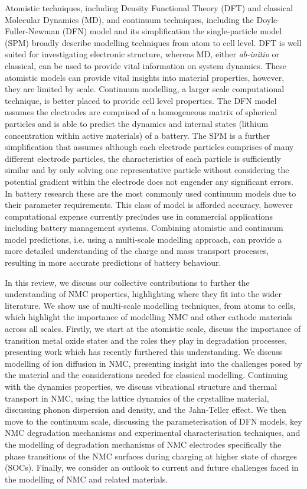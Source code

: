 \documentclass[journal=jacsat,manuscript=article]{achemso}
\begin{document}
Atomistic techniques, including Density Functional Theory (DFT) and classical Molecular Dynamics (MD), and continuum techniques, including the Doyle-Fuller-Newman (DFN) model and its simplification the single-particle model (SPM) \cite{Newman1975porous, Doyle1993DFN} broadly describe modelling techniques from atom to cell level. \cite{Howey_2020} DFT is well suited for investigating electronic structure, whereas MD, either \textit{ab-initio} or classical, can be used to provide vital information on system dynamics. These atomistic models can provide vital insights into material properties, however, they are limited by scale. Continuum modelling, a larger scale computational technique, is better placed to provide cell level properties. The DFN model assumes the electrodes are comprised of a homogeneous matrix of spherical particles and is able to predict the dynamics and internal states (lithium concentration within active materials) of a battery. The SPM is a further simplification that assumes although each electrode particles comprises of many different electrode particles, the characteristics of each particle is sufficiently similar and by only solving one representative particle without considering the potential gradient within the electrode does not engender any significant errors. In battery research these are the most commonly used continuum models due to their parameter requirements. This class of model is afforded accuracy, however computational expense currently precludes use in commercial applications including battery management systems. Combining atomistic and continuum model predictions, i.e. using a multi-scale modelling approach, can provide a more detailed understanding of the charge and mass transport processes, resulting in more accurate predictions of battery behaviour.

In this review, we discuss our collective contributions to further the understanding of NMC properties, highlighting where they fit into the wider literature. We show use of multi-scale modelling techniques, from atoms to cells, which highlight the importance of modelling NMC and other cathode materials across all scales. Firstly, we start at the atomistic scale, discuss the importance of transition metal oxide states and the roles they play in degradation processes, presenting work which has recently furthered this understanding. We discuss modelling of ion diffusion in NMC, presenting insight into the challenges posed by the material and the considerations needed for classical modelling. Continuing with the dynamics properties, we discuss vibrational structure and thermal transport in NMC, using the lattice dynamics of the crystalline material, discussing phonon dispersion and density, and the Jahn-Teller effect. We then move to the continuum scale, discussing the parameterisation of DFN models, key NMC degradation mechanisms and experimental characterisation techniques, and the modelling of degradation mechanisms of NMC electrodes specifically the phase transitions of the NMC surfaces during charging at higher state of charges (SOCs). Finally, we consider an outlook to current and future challenges faced in the modelling of NMC and related materials.
\end{document}
